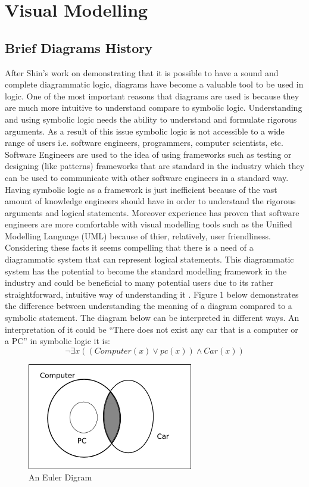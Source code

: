 \documentclass[10pt, a4paper, titlepage]{article}
\begin{document}
\section{Visual Modelling}
\label{sec:visual_modelling}

\subsection{Brief Diagrams History}
After Shin's \cite{Shin_1994} work on demonstrating that it is possible to have a sound and complete diagrammatic logic, diagrams have become a valuable tool to be used in logic. One of the most important reasons that diagrams are used is because they are much more intuitive to understand compare to symbolic logic. Understanding and using symbolic logic needs the ability to understand and formulate rigorous arguments. As a result of this issue symbolic logic is not accessible to a wide range of users i.e. software engineers, programmers, computer scientists, etc. Software Engineers are used to the idea of using frameworks such as testing or designing (like patterns) frameworks that are standard in the industry which they can be used to communicate with other software engineers in a standard way. Having symbolic logic as a framework is just inefficient because of the vast amount of knowledge engineers should have in order to understand  the rigorous arguments and logical statements. Moreover experience has proven that software engineers are more comfortable with visual modelling tools such as the Unified Modelling Language (UML) because of thier, relatively, user friendliness. Considering these facts it seems compelling that there is a need of a diagrammatic system that can represent logical statements. This diagrammatic system has the potential to become the standard modelling framework in the industry and could be beneficial to many potential users due to its rather straightforward, intuitive way of understanding it \cite{Gem_1}.
Figure 1 below demonstrates the difference between understanding the meaning of a diagram compared to a symbolic statement. The diagram below can be interpreted in different ways. An interpretation of it could be “There does not exist any car that is a computer or a PC” in symbolic logic it is:
$$ \neg\exists x ((Computer(x) \vee pc(x)) \wedge Car(x))$$
\begin{figure}[h]
\centering
\includegraphics{images/diag2_21.png}
\caption{An Euler Digram}
\end{figure}
\end{document}
